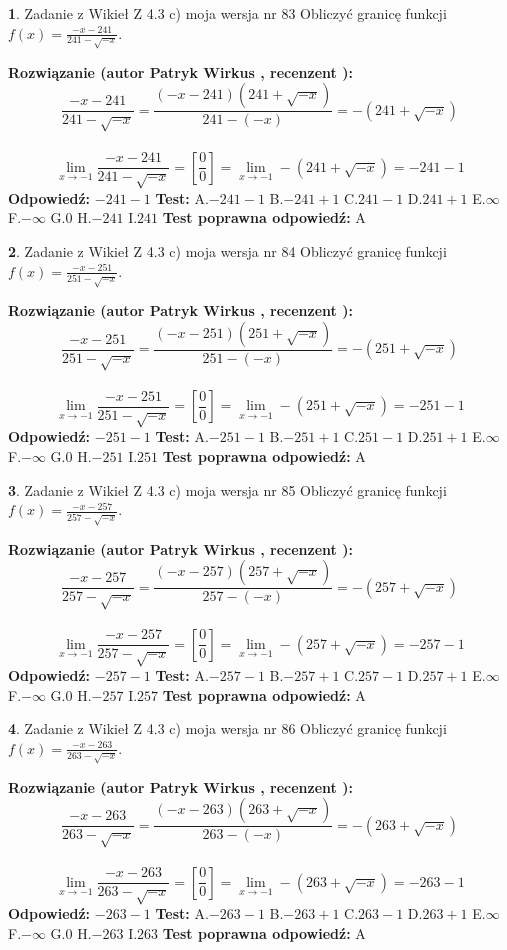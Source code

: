 \documentclass[12pt, a4paper]{article}
\theoremstyle{definition} %
\newtheorem{zad}{}
\newcommand{\zadStart}[1]{\begin{zad}#1\newline}
\newcommand{\zadStop}{\end{zad}}
\newcommand{\rozwStart}[2]{\noindent \textbf{Rozwiązanie (autor #1 , recenzent #2): }\newline}
\newcommand{\rozwStop}{\newline}
\newcommand{\odpStart}{\noindent \textbf{Odpowiedź:}\newline}
\newcommand{\odpStop}{\newline}
\newcommand{\testStart}{\noindent \textbf{Test:}\newline}
\newcommand{\testStop}{\newline}
\newcommand{\kluczStart}{\noindent \textbf{Test poprawna odpowiedź:}\newline}
\newcommand{\kluczStop}{\newline}
\begin{document}
\zadStart{Zadanie z Wikieł Z 4.3 c) moja wersja nr 83}
Obliczyć granicę funkcji $f(x)=\frac{-x-241}{241-\sqrt{-x}}$.
\zadStop
\rozwStart{Patryk Wirkus}{}
$$\frac{-x-241}{241-\sqrt{-x}}=\frac{(-x-241)(241+\sqrt{-x})}{241-(-x)}=-(241+\sqrt{-x})$$
\\
$$\lim\limits_{x\to-1}\frac{-x-241}{241-\sqrt{-x}}=[\frac{0}{0}]=\lim\limits_{x\to-1}-(241+\sqrt{-x}) =-241-1$$
\rozwStop
\odpStart
$-241-1$
\odpStop
\testStart
A.$-241-1$
B.$-241+1$
C.$241-1$
D.$241+1$
E.$\infty$
F.$-\infty$
G.$0$
H.$-241$
I.$241$
\testStop
\kluczStart
A
\kluczStop



\zadStart{Zadanie z Wikieł Z 4.3 c) moja wersja nr 84}
Obliczyć granicę funkcji $f(x)=\frac{-x-251}{251-\sqrt{-x}}$.
\zadStop
\rozwStart{Patryk Wirkus}{}
$$\frac{-x-251}{251-\sqrt{-x}}=\frac{(-x-251)(251+\sqrt{-x})}{251-(-x)}=-(251+\sqrt{-x})$$
\\
$$\lim\limits_{x\to-1}\frac{-x-251}{251-\sqrt{-x}}=[\frac{0}{0}]=\lim\limits_{x\to-1}-(251+\sqrt{-x}) =-251-1$$
\rozwStop
\odpStart
$-251-1$
\odpStop
\testStart
A.$-251-1$
B.$-251+1$
C.$251-1$
D.$251+1$
E.$\infty$
F.$-\infty$
G.$0$
H.$-251$
I.$251$
\testStop
\kluczStart
A
\kluczStop



\zadStart{Zadanie z Wikieł Z 4.3 c) moja wersja nr 85}
Obliczyć granicę funkcji $f(x)=\frac{-x-257}{257-\sqrt{-x}}$.
\zadStop
\rozwStart{Patryk Wirkus}{}
$$\frac{-x-257}{257-\sqrt{-x}}=\frac{(-x-257)(257+\sqrt{-x})}{257-(-x)}=-(257+\sqrt{-x})$$
\\
$$\lim\limits_{x\to-1}\frac{-x-257}{257-\sqrt{-x}}=[\frac{0}{0}]=\lim\limits_{x\to-1}-(257+\sqrt{-x}) =-257-1$$
\rozwStop
\odpStart
$-257-1$
\odpStop
\testStart
A.$-257-1$
B.$-257+1$
C.$257-1$
D.$257+1$
E.$\infty$
F.$-\infty$
G.$0$
H.$-257$
I.$257$
\testStop
\kluczStart
A
\kluczStop



\zadStart{Zadanie z Wikieł Z 4.3 c) moja wersja nr 86}
Obliczyć granicę funkcji $f(x)=\frac{-x-263}{263-\sqrt{-x}}$.
\zadStop
\rozwStart{Patryk Wirkus}{}
$$\frac{-x-263}{263-\sqrt{-x}}=\frac{(-x-263)(263+\sqrt{-x})}{263-(-x)}=-(263+\sqrt{-x})$$
\\
$$\lim\limits_{x\to-1}\frac{-x-263}{263-\sqrt{-x}}=[\frac{0}{0}]=\lim\limits_{x\to-1}-(263+\sqrt{-x}) =-263-1$$
\rozwStop
\odpStart
$-263-1$
\odpStop
\testStart
A.$-263-1$
B.$-263+1$
C.$263-1$
D.$263+1$
E.$\infty$
F.$-\infty$
G.$0$
H.$-263$
I.$263$
\testStop
\kluczStart
A
\kluczStop
\end{document}
